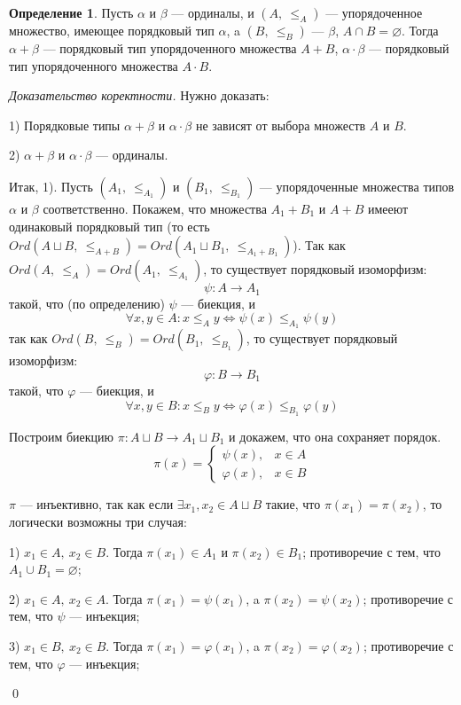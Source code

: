 \documentclass[12pt,oneside]{article}
\theoremstyle{definition}
\newtheorem{definition}{Определение}
\newenvironment{ourproof}[1]{\textit{Доказательство #1.}}{\qed}
\begin{document}
\begin{definition}
Пусть $\alpha$ и $\beta$ --- ординалы, и $(A,\ \leqslant_A)$ --- упорядоченное множество, имеющее порядковый тип $\alpha$, a $(B,\ \leqslant_B)$ --- $\beta$, $A\cap B = \varnothing$. Тогда $\alpha + \beta$ --- порядковый тип упорядоченного множества $A+B$, $\alpha \cdot \beta$ --- порядковый тип упорядоченного множества $A\cdot B$.
\end{definition}
\begin{ourproof}{коректности}\label{sum_ord}
Нужно доказать:

1) Порядковые типы $\alpha + \beta$ и $\alpha \cdot \beta$ не зависят от выбора множеств $A$ и $B$.

2) $\alpha + \beta$ и $\alpha \cdot \beta$ --- ординалы.

Итак, 1). Пусть $(A_1,\ \leqslant_{A_1})$ и $(B_1,\ \leqslant_{B_1})$ --- упорядоченные множества типов $\alpha$ и $\beta$ соответственно. Покажем, что множества $A_1 + B_1$ и $A + B$ имееют одинаковый порядковый тип (то есть $Ord(A\sqcup B,\  \leqslant_{A+B}) = Ord(A_1\sqcup B_1,\ \leqslant_{A_1+B_1})$). Так как $Ord(A,\ \leqslant_A) = Ord(A_1,\ \leqslant_{A_1})$, то существует порядковый изоморфизм:
$$\psi : A \longrightarrow A_1$$
такой, что (по определению) $\psi$ --- биекция, и 
$$\forall x,y\in A : x\leqslant_A y \Longleftrightarrow \psi(x) \leqslant_{A_1} \psi(y)$$
так как $Ord(B,\ \leqslant_B)=Ord(B_1,\ \leqslant_{B_1})$, то существует порядковый изоморфизм:
$$\varphi : B \longrightarrow B_1 $$
такой, что $\varphi$ --- биекция, и
$$\forall x,y\in B : x\leqslant_B y \Longleftrightarrow \varphi(x)\leqslant_{B_1}\varphi(y)$$

Построим биекцию $\pi : A\sqcup B \longrightarrow A_1\sqcup B_1$ и докажем, что она сохраняет порядок.
$$\pi(x) = \begin{cases}
\psi(x), & x\in A\\
\varphi(x), & x\in B
\end{cases}$$

$\pi$ --- инъективно, так как если $\exists x_1, x_2\in A\sqcup B$ такие, что $\pi (x_1)=\pi (x_2)$, то логически возможны три случая:

1) $x_1\in A,\ x_2\in B$. Тогда $\pi(x_1)\in A_1$ и $\pi(x_2)\in B_1$; противоречие с тем, что $A_1\cup B_1 = \varnothing$;

2) $x_1\in A,\ x_2\in A$. Тогда $\pi(x_1) = \psi(x_1)$, a $\pi(x_2)=\psi(x_2)$; противоречие с тем, что $\psi$ --- инъекция;

3) $x_1\in B,\ x_2\in B$. Тогда $\pi(x_1) = \varphi(x_1)$, a $\pi(x_2)=\varphi(x_2)$; противоречие с тем, что $\varphi$ --- инъекция;


\end{ourproof}
\end{document}
